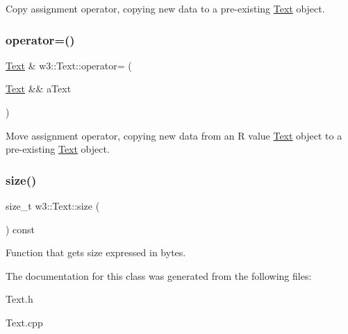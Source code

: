 Copy assignment operator, copying new data to a pre-\/existing \mbox{\hyperlink{classw3_1_1Text}{Text}} object. \mbox{\label{classw3_1_1Text_a0cdbe0667f1d75b600276ec718ab2520}} 
\subsubsection{\texorpdfstring{operator=()}{operator=()}\hspace{0.1cm}{\footnotesize\ttfamily [2/2]}}
{\footnotesize\ttfamily \mbox{\hyperlink{classw3_1_1Text}{Text}} \& w3\+::\+Text\+::operator= (\begin{DoxyParamCaption}\item[{\mbox{\hyperlink{classw3_1_1Text}{Text}} \&\&}]{a\+Text }\end{DoxyParamCaption})}

Move assignment operator, copying new data from an R value \mbox{\hyperlink{classw3_1_1Text}{Text}} object to a pre-\/existing \mbox{\hyperlink{classw3_1_1Text}{Text}} object. \mbox{\label{classw3_1_1Text_aa738305950f5a5def3c56b98dcc5e14a}} 
\subsubsection{\texorpdfstring{size()}{size()}}
{\footnotesize\ttfamily size\+\_\+t w3\+::\+Text\+::size (\begin{DoxyParamCaption}{ }\end{DoxyParamCaption}) const}

Function that gets size expressed in bytes. 

The documentation for this class was generated from the following files\+:\begin{DoxyCompactItemize}
\item 
Text.\+h\item 
Text.\+cpp\end{DoxyCompactItemize}
